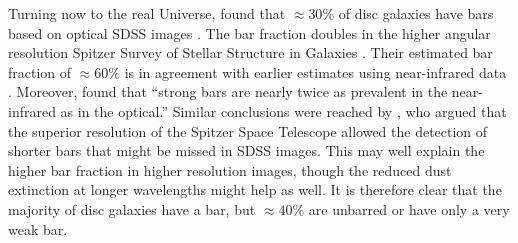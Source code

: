 \documentclass[fleqn,usenatbib,useAMS,onecolumn]{mnras} %
\begin{document}
Turning now to the real Universe, \citet{Masters_2011} found that $\approx 30\%$ of disc galaxies have bars based on optical SDSS images \citep{SDSS}. The bar fraction doubles in the higher angular resolution Spitzer Survey of Stellar Structure in Galaxies \citep[S\textsuperscript{4}G;][]{Erwin_2018}. Their estimated bar fraction of $\approx 60\%$ is in agreement with earlier estimates using near-infrared data \citep{Eskridge_2000, Sheth_2008}. Moreover, \citet{Eskridge_2000} found that ``strong bars are nearly twice as prevalent in the near-infrared as in the optical.'' Similar conclusions were reached by \citet{Erwin_2018}, who argued that the superior resolution of the Spitzer Space Telescope allowed the detection of shorter bars that might be missed in SDSS images. This may well explain the higher bar fraction in higher resolution images, though the reduced dust extinction at longer wavelengths might help as well. It is therefore clear that the majority of disc galaxies have a bar, but $\approx 40\%$ are unbarred or have only a very weak bar.
\end{document}
